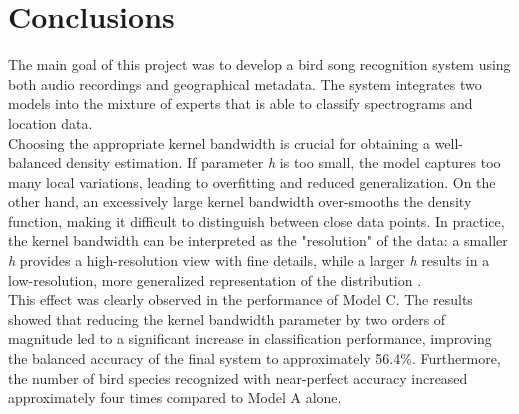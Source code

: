 \documentclass[runningheads]{llncs}
\begin{document}
\section*{Conclusions}

The main goal of this project was to develop a bird song recognition system using both audio recordings and geographical metadata. The system integrates two models into the mixture of experts that is able to classify spectrograms and location data. \\
\noindent Choosing the appropriate kernel bandwidth is crucial for obtaining a well-balanced density estimation. If parameter \textit{h} is too small, the model captures too many local variations, leading to overfitting and reduced generalization. On the other hand, an excessively large kernel bandwidth over-smooths the density function, making it difficult to distinguish between close data points. In practice, the kernel bandwidth can be interpreted as the "resolution" of the data: a smaller \textit{h} provides a high-resolution view with fine details, while a larger \textit{h} results in a low-resolution, more generalized representation of the distribution \cite{Combination_of__KDE_in_Classification}.\\
This effect was clearly observed in the performance of Model C. The results showed that reducing the kernel bandwidth parameter by two orders of magnitude led to a significant increase in classification performance, improving the balanced accuracy of the final system to approximately 56.4\%. Furthermore, the number of bird species recognized with near-perfect accuracy increased approximately four times compared to Model A alone.



\end{document}
